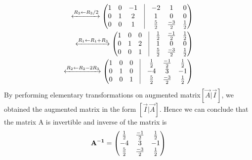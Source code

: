    \begin{align}
    \xleftrightarrow{R_3\leftarrow R_3/2}
    \myvec{1 & 0 & -1 & \vrule & -2 & 1 & 0\\ 0 & 1 & 2 & \vrule & 1 & 0 & 0\\0 & 0 & 1 &\vrule &\frac{5}{2} &\frac{-3}{2} &\frac{1}{2}}
    \\
    \xleftrightarrow{R_1\leftarrow R_1+R_3}
    \myvec{1 & 0 & 0 & \vrule & \frac{1}{2} & \frac{-1}{2} & \frac{1}{2}\\ 0 & 1 & 2 & \vrule & 1 & 0 & 0\\0 & 0 & 1 &\vrule &\frac{5}{2} &\frac{-3}{2} &\frac{1}{2}}
    \\
    \xleftrightarrow{R_2\leftarrow R_2-2R_3}
    \myvec{1 & 0 & 0 & \vrule & \frac{1}{2} & \frac{-1}{2} & \frac{1}{2}\\ 0 & 1 & 0 & \vrule & -4 & 3 & -1\\0 & 0 & 1 &\vrule &\frac{5}{2} &\frac{-3}{2} &\frac{1}{2}}
    \end{align}
    By performing elementary transformations on augmented matrix$ [\vec{A} | \vec{I}]$, we obtained the augmented matrix in the form $ [\vec{I} | \vec{A}]$. 
    Hence we can conclude that the matrix A is invertible and inverse of the matrix is
    \begin{align}
\mathbf{A^{-1}}=\begin{pmatrix}  \frac{1}{2} & \frac{-1}{2} & \frac{1}{2} \\  -4 & 3 & -1\\ \frac{5}{2} &\frac{-3}{2} &\frac{1}{2}\end{pmatrix}
    \end{align}
